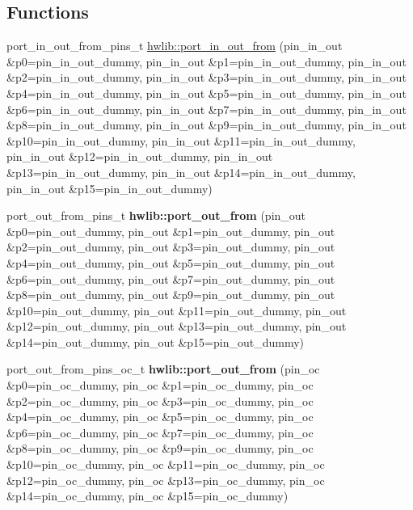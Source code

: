 \subsection*{Functions}
\textbf{ }\par
\begin{DoxyCompactItemize}
\item 
port\+\_\+in\+\_\+out\+\_\+from\+\_\+pins\+\_\+t \hyperlink{namespacehwlib_a15d98d6ba4e6f7d19e67582e61b00293}{hwlib\+::port\+\_\+in\+\_\+out\+\_\+from} (pin\+\_\+in\+\_\+out \&p0=pin\+\_\+in\+\_\+out\+\_\+dummy, pin\+\_\+in\+\_\+out \&p1=pin\+\_\+in\+\_\+out\+\_\+dummy, pin\+\_\+in\+\_\+out \&p2=pin\+\_\+in\+\_\+out\+\_\+dummy, pin\+\_\+in\+\_\+out \&p3=pin\+\_\+in\+\_\+out\+\_\+dummy, pin\+\_\+in\+\_\+out \&p4=pin\+\_\+in\+\_\+out\+\_\+dummy, pin\+\_\+in\+\_\+out \&p5=pin\+\_\+in\+\_\+out\+\_\+dummy, pin\+\_\+in\+\_\+out \&p6=pin\+\_\+in\+\_\+out\+\_\+dummy, pin\+\_\+in\+\_\+out \&p7=pin\+\_\+in\+\_\+out\+\_\+dummy, pin\+\_\+in\+\_\+out \&p8=pin\+\_\+in\+\_\+out\+\_\+dummy, pin\+\_\+in\+\_\+out \&p9=pin\+\_\+in\+\_\+out\+\_\+dummy, pin\+\_\+in\+\_\+out \&p10=pin\+\_\+in\+\_\+out\+\_\+dummy, pin\+\_\+in\+\_\+out \&p11=pin\+\_\+in\+\_\+out\+\_\+dummy, pin\+\_\+in\+\_\+out \&p12=pin\+\_\+in\+\_\+out\+\_\+dummy, pin\+\_\+in\+\_\+out \&p13=pin\+\_\+in\+\_\+out\+\_\+dummy, pin\+\_\+in\+\_\+out \&p14=pin\+\_\+in\+\_\+out\+\_\+dummy, pin\+\_\+in\+\_\+out \&p15=pin\+\_\+in\+\_\+out\+\_\+dummy)
\item 
\mbox{\label{namespacehwlib_a55a526b8220ffb767b213662174b8565}} 
port\+\_\+out\+\_\+from\+\_\+pins\+\_\+t {\bfseries hwlib\+::port\+\_\+out\+\_\+from} (pin\+\_\+out \&p0=pin\+\_\+out\+\_\+dummy, pin\+\_\+out \&p1=pin\+\_\+out\+\_\+dummy, pin\+\_\+out \&p2=pin\+\_\+out\+\_\+dummy, pin\+\_\+out \&p3=pin\+\_\+out\+\_\+dummy, pin\+\_\+out \&p4=pin\+\_\+out\+\_\+dummy, pin\+\_\+out \&p5=pin\+\_\+out\+\_\+dummy, pin\+\_\+out \&p6=pin\+\_\+out\+\_\+dummy, pin\+\_\+out \&p7=pin\+\_\+out\+\_\+dummy, pin\+\_\+out \&p8=pin\+\_\+out\+\_\+dummy, pin\+\_\+out \&p9=pin\+\_\+out\+\_\+dummy, pin\+\_\+out \&p10=pin\+\_\+out\+\_\+dummy, pin\+\_\+out \&p11=pin\+\_\+out\+\_\+dummy, pin\+\_\+out \&p12=pin\+\_\+out\+\_\+dummy, pin\+\_\+out \&p13=pin\+\_\+out\+\_\+dummy, pin\+\_\+out \&p14=pin\+\_\+out\+\_\+dummy, pin\+\_\+out \&p15=pin\+\_\+out\+\_\+dummy)
\item 
\mbox{\label{namespacehwlib_a229f5d55a43d5bcfc303b04a5f6cf3ff}} 
port\+\_\+out\+\_\+from\+\_\+pins\+\_\+oc\+\_\+t {\bfseries hwlib\+::port\+\_\+out\+\_\+from} (pin\+\_\+oc \&p0=pin\+\_\+oc\+\_\+dummy, pin\+\_\+oc \&p1=pin\+\_\+oc\+\_\+dummy, pin\+\_\+oc \&p2=pin\+\_\+oc\+\_\+dummy, pin\+\_\+oc \&p3=pin\+\_\+oc\+\_\+dummy, pin\+\_\+oc \&p4=pin\+\_\+oc\+\_\+dummy, pin\+\_\+oc \&p5=pin\+\_\+oc\+\_\+dummy, pin\+\_\+oc \&p6=pin\+\_\+oc\+\_\+dummy, pin\+\_\+oc \&p7=pin\+\_\+oc\+\_\+dummy, pin\+\_\+oc \&p8=pin\+\_\+oc\+\_\+dummy, pin\+\_\+oc \&p9=pin\+\_\+oc\+\_\+dummy, pin\+\_\+oc \&p10=pin\+\_\+oc\+\_\+dummy, pin\+\_\+oc \&p11=pin\+\_\+oc\+\_\+dummy, pin\+\_\+oc \&p12=pin\+\_\+oc\+\_\+dummy, pin\+\_\+oc \&p13=pin\+\_\+oc\+\_\+dummy, pin\+\_\+oc \&p14=pin\+\_\+oc\+\_\+dummy, pin\+\_\+oc \&p15=pin\+\_\+oc\+\_\+dummy)

\end{DoxyCompactItemize}
